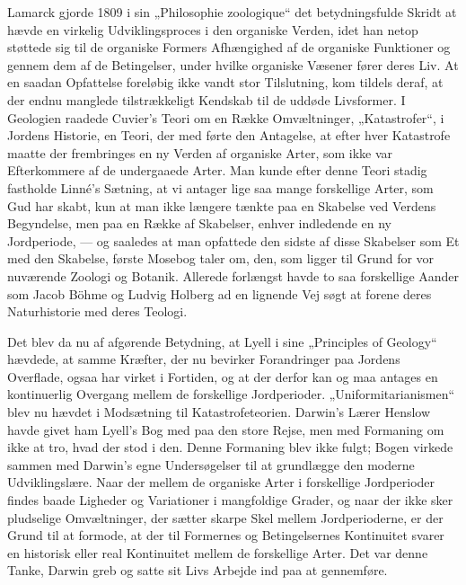 \documentclass[12pt,a4paper,openany]{book}
\newcommand{\opage}[1]{\marginnote{\footnotesize\textit{[#1]}}}
\begin{document}
Lamarck gjorde 1809 i sin „Philosophie zoologique“ det betydningsfulde
Skridt at hævde en virkelig Udviklingsproces i den organiske
Verden, idet han netop støttede sig til de organiske Formers
Afhængighed af de organiske Funktioner og gennem dem af de Betingelser,
under hvilke organiske Væsener fører deres Liv. At en
saadan Opfattelse foreløbig ikke vandt stor Tilslutning, kom tildels
deraf, at der endnu manglede tilstrækkeligt Kendskab til de uddøde
Livsformer. I Geologien raadede Cuvier’s Teori om en Række Omvæltninger,
„Katastrofer“, i Jordens Historie, en Teori, der med%
\opage{37}førte den Antagelse, at efter hver Katastrofe maatte der frembringes
en ny Verden af organiske Arter, som ikke var Efterkommere af de
undergaaede Arter. Man kunde efter denne Teori stadig fastholde
Linné’s Sætning, at vi antager lige saa mange forskellige Arter, som
Gud har skabt, kun at man ikke længere tænkte paa en Skabelse
ved Verdens Begyndelse, men paa en Række af Skabelser, enhver
indledende en ny Jordperiode, --- og saaledes at man opfattede den
sidste af disse Skabelser som Et med den Skabelse, første Mosebog
taler om, den, som ligger til Grund for vor nuværende Zoologi og
Botanik. Allerede forlængst havde to saa forskellige Aander som
Jacob Böhme og Ludvig Holberg ad en lignende Vej søgt at forene
deres Naturhistorie med deres Teologi.

Det blev da nu af afgørende Betydning, at Lyell i sine „Principles
of Geology“ hævdede, at samme Kræfter, der nu bevirker Forandringer
paa Jordens Overflade, ogsaa har virket i Fortiden, og at
der derfor kan og maa antages en kontinuerlig Overgang mellem de
forskellige Jordperioder. „Uniformitarianismen“ blev nu hævdet i
Modsætning til Katastrofeteorien. Darwin’s Lærer Henslow havde
givet ham Lyell’s Bog med paa den store Rejse, men med Formaning
om ikke at tro, hvad der stod i den. Denne Formaning blev
ikke fulgt; Bogen virkede sammen med Darwin’s egne Undersøgelser
til at grundlægge den moderne Udviklingslære. Naar der mellem
de organiske Arter i forskellige Jordperioder findes baade Ligheder
og Variationer i mangfoldige Grader, og naar der ikke sker pludselige
Omvæltninger, der sætter skarpe Skel mellem Jordperioderne,
er der Grund til at formode, at der til Formernes og Betingelsernes
Kontinuitet svarer en historisk eller real Kontinuitet mellem de forskellige
Arter. Det var denne Tanke, Darwin greb og satte sit Livs
Arbejde ind paa at gennemføre.
\end{document}

